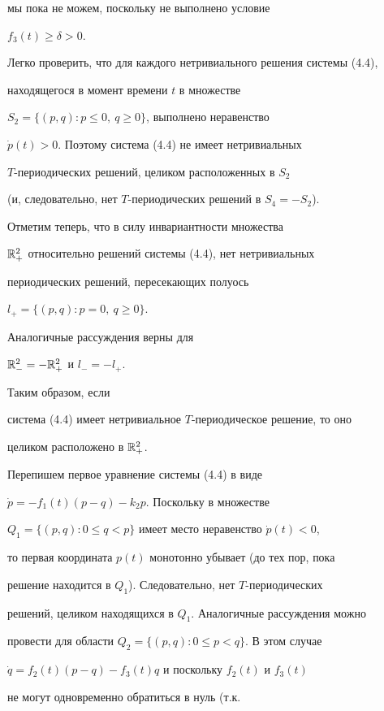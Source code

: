 мы пока не можем, поскольку не выполнено условие


$f_3(t) \ge \delta > 0$.





Легко проверить, что для каждого нетривиального решения системы (4.4),


находящегося в момент времени $t$ в множестве


$S_2 = \{(p,q) : p\le 0,\ q\ge 0\}$, выполнено неравенство


$\Dot p(t) > 0$. Поэтому система (4.4) не имеет нетривиальных


$T$-периодических решений, целиком расположенных в $S_2$


(и, следовательно, нет $T$-периодических решений в $S_4=-S_2$).


Отметим теперь, что в силу инвариантности множества


$\Bbb R_{+}^2$ относительно решений системы (4.4), нет нетривиальных


периодических решений, пересекающих полуось


$l_{+}=\{(p,q): p=0,\ q\ge 0\}$.


Аналогичные рассуждения верны для


$\Bbb R_{-}^2 = -\Bbb R_{+}^2$ и $l_{-} = -l_{+}$.


Таким образом, если


система (4.4) имеет нетривиальное $T$-периодическое решение, то оно


целиком расположено в $\Bbb R_{+}^2$.





Перепишем первое уравнение системы (4.4) в виде


$\Dot p = -f_1(t)(p - q) - k_2p$. Поскольку в множестве


$Q_1=\{(p,q): 0\le q < p\}$ имеет место неравенство $\Dot p(t) < 0$,


то первая координата $p(t)$ монотонно убывает (до тех пор, пока


решение находится в $Q_1$). Следовательно, нет $T$-периодических


решений, целиком находящихся в $Q_1$. Аналогичные рассуждения можно


провести для области $Q_2=\{(p,q): 0\le p < q\}$. В этом случае


$\Dot q =f_2(t)(p - q) - f_3(t)q$  и поскольку $f_2(t)$ и $f_3(t)$


не могут одновременно обратиться в нуль (т.к.


